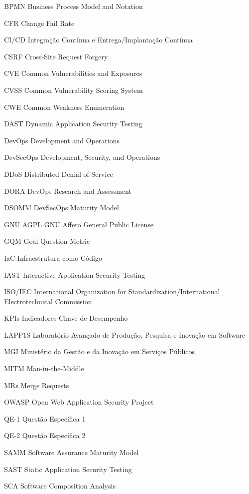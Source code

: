 \begin{siglas}
  \item[BPMN] Business Process Model and Notation
  \item[CFR] Change Fail Rate
  \item[CI/CD] Integração Contínua e Entrega/Implantação Contínua
  \item[CSRF] Cross-Site Request Forgery
  \item[CVE] Common Vulnerabilities and Exposures
  \item[CVSS] Common Vulnerability Scoring System
  \item[CWE] Common Weakness Enumeration
  \item[DAST] Dynamic Application Security Testing
  \item[DevOps] Development and Operations
  \item[DevSecOps] Development, Security, and Operations
  \item[DDoS] Distributed Denial of Service
  \item[DORA] DevOps Research and Assessment
  \item[DSOMM] DevSecOps Maturity Model
  \item[GNU AGPL] GNU Affero General Public License
  \item[GQM] Goal Question Metric
  \item[IaC] Infraestrutura como Código
  \item[IAST] Interactive Application Security Testing
  \item[ISO/IEC] International Organization for Standardization/International Electrotechnical Commission
  \item[KPIs] Indicadores-Chave de Desempenho
  \item[LAPP1S] Laboratório Avançado de Produção, Pesquisa e Inovação em Software
  \item[MGI] Ministério da Gestão e da Inovação em Serviços Públicos
  \item[MITM] Man-in-the-Middle
  \item[MRs] Merge Requests
  \item[OWASP] Open Web Application Security Project
  \item[QE-1] Questão Específica 1
  \item[QE-2] Questão Específica 2
  \item[SAMM] Software Assurance Maturity Model
  \item[SAST] Static Application Security Testing
  \item[SCA] Software Composition Analysis

\end{siglas}
